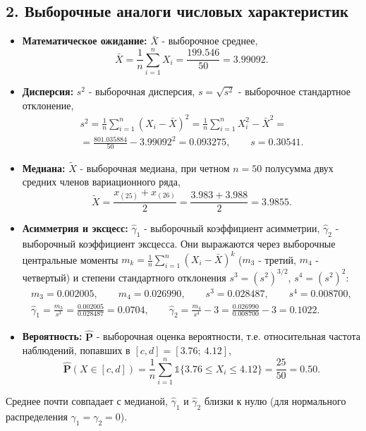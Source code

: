 \documentclass[12pt]{spbstu-task}
\renewcommand{\Prob}{\mathbf{P}}
\newcommand{\ind}{\mathds{1}}
\begin{document}
\subsection*{2. Выборочные аналоги числовых характеристик}
\begin{itemize}[label=\textbullet]
  \item \textbf{Математическое ожидание:} \(\bar{X}\) - выборочное среднее,
  \begin{displaymath}
    \bar{X} = \frac{1}{n}\sum_{i=1}^{n}X_i = \frac{199.546}{50} = 3.99092.
  \end{displaymath}
  \item \textbf{Дисперсия:} \(s^2\) - выборочная дисперсия, \(s = \sqrt{s^2}\) - выборочное стандартное отклонение,
  \begin{gather*}
    s^2 = \frac{1}{n}\sum_{i=1}^{n}\left(X_i - \bar{X}\right)^2 = \frac{1}{n}\sum_{i=1}^{n}X_i^2 - \bar{X}^2 =\\
    = \frac{801.035884}{50} - 3.99092^2 = 0.093275,\qquad s = 0.30541.
  \end{gather*}
  \item \textbf{Медиана:} \(\tilde{X}\) - выборочная медиана, при четном \(n = 50\) полусумма двух средних членов
  вариационного ряда,
  \begin{displaymath}
    \tilde{X} = \frac{x_{(25)} + x_{(26)}}{2} = \frac{3.983 + 3.988}{2} = 3.9855.
  \end{displaymath}
  \item \textbf{Асимметрия и эксцесс:} \(\hat{\gamma}_1\) - выборочный коэффициент асимметрии,
  \(\hat{\gamma}_2\) - выборочный коэффициент эксцесса. Они выражаются через выборочные центральные моменты
  \(m_k = \frac{1}{n}\sum_{i=1}^{n}\left(X_i - \bar{X}\right)^k\) (\(m_3\) - третий, \(m_4\) - четвертый)
  и степени стандартного отклонения \(s^3 = \left(s^2\right)^{3/2}\), \(s^4 = \left(s^2\right)^2\):
  \begin{gather*}
    m_3 = 0.002005,\qquad m_4 = 0.026990,\qquad s^3 = 0.028487,\qquad s^4 = 0.008700,\\
    \hat{\gamma}_1 = \frac{m_3}{s^3} = \frac{0.002005}{0.028487} = 0.0704,\qquad
    \hat{\gamma}_2 = \frac{m_4}{s^4} - 3 = \frac{0.026990}{0.008700} - 3 = 0.1022.
  \end{gather*}
  \item \textbf{Вероятность:} \(\hat{\Prob}\) - выборочная оценка вероятности, т.е. относительная частота
  наблюдений, попавших в \([c, d] = [3.76;\ 4.12]\),
  \begin{displaymath}
    \hat{\Prob}\left(X \in [c, d]\right) = \frac{1}{n}\sum_{i=1}^{n}\ind\{3.76 \le X_i \le 4.12\} = \frac{25}{50} = 0.50.
  \end{displaymath}
\end{itemize}
Среднее почти совпадает с медианой, \(\hat{\gamma}_1\) и \(\hat{\gamma}_2\) близки к нулю
(для нормального распределения \(\gamma_1 = \gamma_2 = 0\)).
\end{document}
